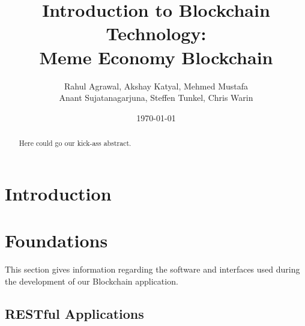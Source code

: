 \documentclass[12pt]{article}
\title{Introduction to Blockchain Technology:\\
    Meme Economy Blockchain}
\date{\today}
\author{Rahul Agrawal, Akshay Katyal, Mehmed Mustafa\\
Anant Sujatanagarjuna, Steffen Tunkel, Chris Warin}
\begin{document}
\maketitle
\thispagestyle{empty}
\begin{abstract}%
Here could go our kick-ass abstract.

\end{abstract}

\newpage
\tableofcontents
\newpage




\section{Introduction} \label{sec:Intro}%


\section{Foundations} \label{sec:Foundations} %
This section gives information regarding the software and interfaces used during the development of our Blockchain application.

\subsection{RESTful Applications}
\end{document}
